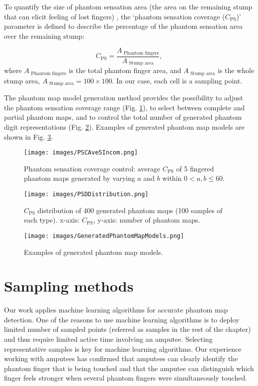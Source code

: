 To quantify the size of phantom sensation area (the area on the remaining stump that can elicit  feeling of lost fingers) , the `phantom sensation coverage ($C_{\text{PS}}$)'  parameter is defined to describe the percentage of the phantom sensation area over the remaining stump:

\begin{equation}
\label{eq:PSC}
C_{\text{PS}} = \frac{ A_{\text{ Phantom fingers}}}{A_{\text{ Stump  area}}}, 
\end{equation}
where $A_{\text{ Phantom fingers}}$ is the total phantom finger area, and $A_{\text{ Stump  area}}$ is the whole stump area,  $A_{\text{ Stump  area}} = 100 \times 100$. In our case, each cell is a sampling point.

The phantom map model generation method provides the possibility to adjust the phantom sensation coverage range (Fig. \ref{fig:PSCAve5Incom}), to select between complete and partial phantom maps, and to control the total number of generated phantom digit representations (Fig. \ref{Fig:PSDDistribution}). Examples of generated phantom map models are shown in Fig. \ref{fig:PhantomMapModel}.

\begin{figure}[htb]
    \centering
    \texttt{[image: images/PSCAve5Incom.png]}
    \caption{Phantom sensation coverage control: average $C_{\text{PS}}$ of 5 fingered phantom maps generated by varying $a$ and $b$ within $0<a,b \leq 60$.}
    \label{fig:PSCAve5Incom}
\end{figure} 

\begin{figure}[htb]
    \centering
    \texttt{[image: images/PSDDistribution.png]}
    \caption{$C_{\text{PS}}$ distribution of 400 generated phantom maps (100 samples of each type). x-axis: $C_{\text{PS}}$, y-axis: number of phantom maps. }
    \label{Fig:PSDDistribution}
\end{figure}

\begin{figure}[htb]
    \centering
    \texttt{[image: images/GeneratedPhantomMapModels.png]}
    \caption{ Examples of generated phantom map models.}
    \label{fig:PhantomMapModel}
\end{figure} 


\section{Sampling methods}
\label{chap2:sec:sampling_methods}
Our work applies machine learning algorithms for accurate phantom map detection. One of the reasons to use machine learning algorithms is to deploy limited number of sampled points (referred as samples in the rest of the chapter) and thus require limited active time involving an amputee. 
Selecting representative samples is key for machine learning algorithms. Our experience working with amputees has confirmed that amputees can clearly identify the phantom finger that is being touched and that the amputee can distinguish which finger feels stronger when several phantom fingers were simultaneously touched. 

